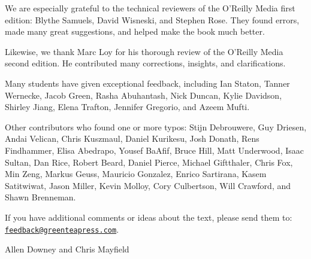 We are especially grateful to the technical reviewers of the O'Reilly Media first edition: Blythe Samuels, David Wisneski, and Stephen Rose.
They found errors, made many great suggestions, and helped make the book much better.

Likewise, we thank Marc Loy for his thorough review of the O'Reilly Media second edition.
He contributed many corrections, insights, and clarifications.

Many students have given exceptional feedback, including Ian Staton, Tanner Wernecke, Jacob Green, Rasha Abuhantash, Nick Duncan, Kylie Davidson, Shirley Jiang, Elena Trafton, Jennifer Gregorio, and Azeem Mufti.

Other contributors who found one or more typos: Stijn Debrouwere, Guy Driesen, Andai Velican, Chris Kuszmaul, Daniel Kurikesu, Josh Donath, Rens Findhammer, Elisa Abedrapo, Yousef BaAfif, Bruce Hill, Matt Underwood, Isaac Sultan, Dan Rice, Robert Beard, Daniel Pierce, Michael Giftthaler, Chris Fox, Min Zeng, Markus Geuss, Mauricio Gonzalez, Enrico Sartirana, Kasem Satitwiwat, Jason Miller, Kevin Molloy, Cory Culbertson, Will Crawford, and Shawn Brenneman.


If you have additional comments or ideas about the text, please send them to: \href{mailto:feedback@greenteapress.com}{\tt feedback@greenteapress.com}.

\hfill Allen Downey and Chris Mayfield
